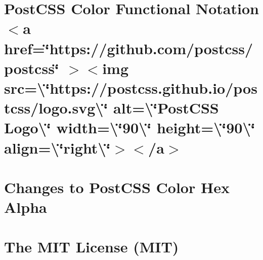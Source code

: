 \documentclass[twoside]{book}
\newcommand{\+}{\discretionary{\mbox{\scriptsize$\hookleftarrow$}}{}{}}
\begin{document}
\chapter{Post\+CSS Color Functional Notation \texorpdfstring{$<$}{<}a href=\char`\"{}https\+://github.\+com/postcss/postcss\char`\"{} \texorpdfstring{$>$}{>}\texorpdfstring{$<$}{<}img src=\textbackslash{}\char`\"{}https\+://postcss.\+github.\+io/postcss/logo.\+svg\textbackslash{}\char`\"{} alt=\textbackslash{}\char`\"{}\+Post\+CSS Logo\textbackslash{}\char`\"{} width=\textbackslash{}\char`\"{}90\textbackslash{}\char`\"{} height=\textbackslash{}\char`\"{}90\textbackslash{}\char`\"{} align=\textbackslash{}\char`\"{}right\textbackslash{}\char`\"{}\texorpdfstring{$>$}{>}\texorpdfstring{$<$}{<}/a\texorpdfstring{$>$}{>}}
\label{md__c___users_vaishnavi_jadhav__desktop__developer_code_mean_stack_example_client_node_modules_pe04269475878cbdf73d2b9260db8ead4}

\chapter{Changes to Post\+CSS Color Hex Alpha}
\label{md__c___users_vaishnavi_jadhav__desktop__developer_code_mean_stack_example_client_node_modules_p880a4c2e672a9c1cd3e55af54bef35c3}

\chapter{The MIT License (MIT)}
\label{md__c___users_vaishnavi_jadhav__desktop__developer_code_mean_stack_example_client_node_modules_pd17fdc36b6e7b62e7f8c54e4f8b44652}

\end{document}

